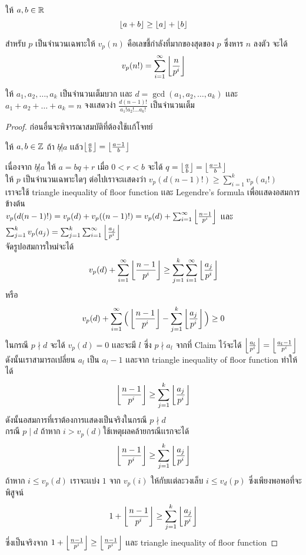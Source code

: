 \documentclass[a4paper,12pt]{scrartcl}
\begin{document}
	\begin{theorem*} ให้ $a,b \in \mathbb R$
		\[ \left\lfloor a+b \right\rfloor \ge \left\lfloor a \right\rfloor+ \left\lfloor b \right\rfloor \]

	\end{theorem*}
	\begin{theorem*}
		สำหรับ $p$ เป็นจำนวนเฉพาะให้ $v_p(n)$ คือเลขชี้กำลังที่มากของสุดของ $p$ ซึ่งหาร $n$ ลงตัว จะได้ \[ v_p(n!) = \sum_{i=1}^{\infty} \left\lfloor \frac{n}{p^i} \right\rfloor \]

	\end{theorem*}
	\begin{example}
		ให้ $a_1,a_2,\dots,a_k$ เป็นจำนวนเต็มบวก เเละ $d = \gcd(a_1,a_2,\dots,a_k) $ เเละ \\ $a_1+a_2+\dots+a_k = n$ จงเเสดวง่า $\frac{d(n-1)!}{a_1!a_2!\dots a_k!}$ เป็นจำนวนเต็ม
	\end{example}
\begin{proof}
ก่อนอื่นจะพิจารณาสมบัติที่ต้องใช้เเก้โจทย์
	\begin{claim*}
		ให้ $a,b \in \mathbb Z$ ถ้า $b \not | a$ เเล้ว$ \left\lfloor \frac{a}{b} \right\rfloor =\left\lfloor \frac{a-1}{b} \right\rfloor$
	\end{claim*}
เนื่องจาก $b \not | a$ ให้ $a = bq+r$ เมื่อ $0<r <b$ จะได้ $q= \left\lfloor \frac{a}{b} \right\rfloor=\left\lfloor \frac{a-1}{b} \right\rfloor$ \\ ให้ $p$ เป็นจำนวนเฉพาะใดๆ
ต่อไปเราจะเเสดงว่า $v_p(d(n-1)!) \ge \sum_{i=1}^{k} {v_p(a_i!)}$\\
เราจะใช้ triangle inequality of floor function เเละ Legendre's formula เพื่อเเสดงอสมการข้างต้น\\
$v_p(d(n-1)!) = v_p(d)+v_p((n-1)!) = v_p(d) + \sum_{i=1}^{\infty} \left\lfloor \frac{n-1}{p^i} \right\rfloor$ เเละ $ \sum_{j=1}^{k}v_p{(a_j)} = \sum_{j=1}^{k}\sum_{i=1}^{\infty} \left\lfloor \frac{a_j}{p^i} \right\rfloor$ \\
จัดรูปอสมการใหม่จะได้ \[ v_p(d) + \sum_{i=1}^{\infty} \left\lfloor \frac{n-1}{p^i} \right\rfloor \ge \sum_{j=1}^{k}\sum_{i=1}^{\infty} \left\lfloor \frac{a_j}{p^i} \right\rfloor  \] หรือ 
\[	v_p(d) + \sum_{i=1}^{\infty}\Big( \left\lfloor \frac{n-1}{p^i} \right\rfloor -\sum_{j=1}^{k}\left\lfloor \frac{a_j}{p^i} \right\rfloor  \Big) \ge 0 \]
ในกรณี $p\nmid d$ จะได้ $v_p(d)=0$ เเละจะมี $l$ ซึ่ง  $p \nmid  a_l$ จากที่ Claim ไว้จะได้ $\left\lfloor \frac{a_l}{p^i} \right\rfloor = \left\lfloor \frac{a_l-1}{p^i} \right\rfloor$
 ดังนั้นเราสามารถเปลี่ยน $a_l$ เป็น $a_l-1$ เเละจาก  triangle inequality of floor function ทำให้ได้ \[ \left\lfloor \frac{n-1}{p^i} \right\rfloor \ge \sum_{j=1}^{k}\left\lfloor \frac{a_j}{p^i} \right\rfloor \]
 ดังนั้นอสมการที่เราต้องการเเสดงเป็นจริงในกรณี $p \nmid d $ \\
กรณี $ p \mid d$ ถ้าหาก $i > v_p(d) $ใช้เหตุผลคล้ายกรณีเเรกจะได้  \[ \left\lfloor \frac{n-1}{p^i} \right\rfloor \ge \sum_{j=1}^{k}\left\lfloor \frac{a_j}{p^i} \right\rfloor \] ถ้าหาก $i \le v_p(d)$ เราจะเเบ่ง $1$ จาก $v_p(i)$ ให้กับเเต่ละวงเล็บ $i \le v_d(p)$ ซึ่งเพียงพอพอที่จะพิสูจน์ \[ 1 + \left\lfloor \frac{n-1}{p^i} \right\rfloor \ge \sum_{j=1}^{k}\left\lfloor \frac{a_j}{p^i} \right\rfloor \] ซึ่งเป็นจริงจาก $1 + \left\lfloor \frac{n-1}{p^i} \right\rfloor \ge \left\lfloor \frac{n-1}{p^i} \right\rfloor$ เเละ  triangle inequality of floor function
\end{proof}
\end{document}
